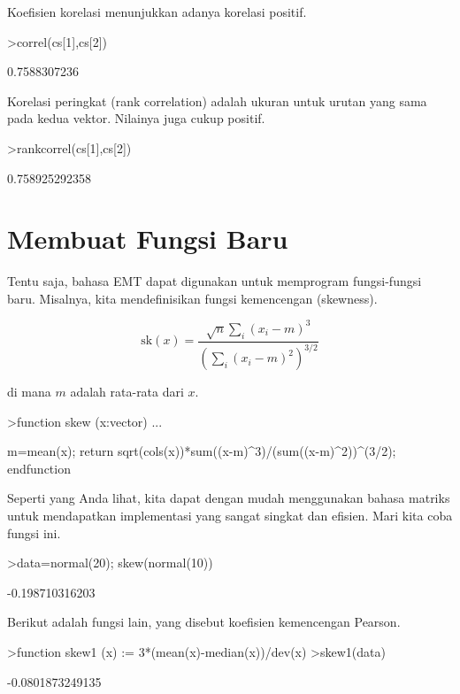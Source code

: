 \documentclass[a4paper,11pt,oneside,enabledeprecatedfontcommands]{scrbook}
\newenvironment{eulernotebook}{}{}
\newcommand{\eulerheading}[1]{\chapter{#1}}
\newenvironment{eulercomment}{\par\medskip\noindent}{\par\medskip}
\newenvironment{eulerformula}{}{}
\begin{document}
\begin{eulernotebook}
		\begin{eulercomment}
			Koefisien korelasi menunjukkan adanya korelasi positif.
		\end{eulercomment}
		\begin{eulerprompt}
			>correl(cs[1],cs[2])
		\end{eulerprompt}
		\begin{euleroutput}
			0.7588307236
		\end{euleroutput}
		\begin{eulercomment}
			Korelasi peringkat (rank correlation) adalah ukuran untuk urutan yang sama pada kedua vektor.
			Nilainya juga cukup positif.
		\end{eulercomment}
		\begin{eulerprompt}
			>rankcorrel(cs[1],cs[2])
		\end{eulerprompt}
		\begin{euleroutput}
			0.758925292358
		\end{euleroutput}
		
		\eulerheading{Membuat Fungsi Baru}
		\begin{eulercomment}
			Tentu saja, bahasa EMT dapat digunakan untuk memprogram fungsi-fungsi baru. Misalnya, kita
			mendefinisikan fungsi kemencengan (skewness).
		\end{eulercomment}
		\begin{eulerformula}
			\[
			\text{sk}(x) = \dfrac{\sqrt{n} \sum_i (x_i-m)^3}{\left(\sum_i (x_i-m)^2\right)^{3/2}}
			\]
		\end{eulerformula}
		\begin{eulercomment}
			di mana $m$ adalah rata-rata dari $x$.
		\end{eulercomment}
		\begin{eulerprompt}
			>function skew (x:vector) ...
		\end{eulerprompt}
		\begin{eulerudf}
			m=mean(x);
			return sqrt(cols(x))*sum((x-m)^3)/(sum((x-m)^2))^(3/2);
			endfunction
		\end{eulerudf}
		\begin{eulercomment}
			Seperti yang Anda lihat, kita dapat dengan mudah menggunakan bahasa matriks untuk mendapatkan
			implementasi yang sangat singkat dan efisien. Mari kita coba fungsi ini.
		\end{eulercomment}
		\begin{eulerprompt}
			>data=normal(20); skew(normal(10))
		\end{eulerprompt}
		\begin{euleroutput}
			-0.198710316203
		\end{euleroutput}
		\begin{eulercomment}
			Berikut adalah fungsi lain, yang disebut koefisien kemencengan Pearson.
		\end{eulercomment}
		\begin{eulerprompt}
			>function skew1 (x) := 3*(mean(x)-median(x))/dev(x)
			>skew1(data)
		\end{eulerprompt}
		\begin{euleroutput}
			-0.0801873249135
		\end{euleroutput}
		

\end{eulernotebook}
\end{document}
